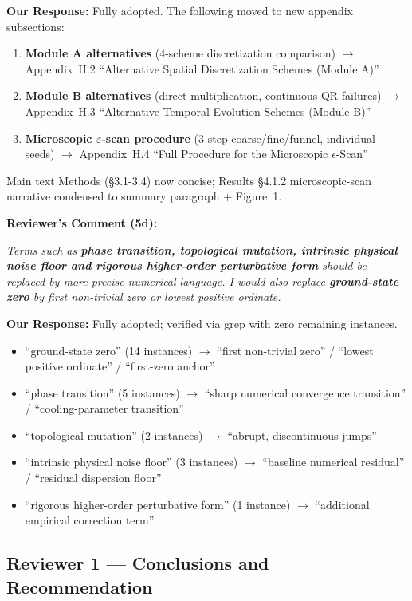 \documentclass[11pt]{article}
\begin{document}
\noindent\textbf{Our Response:} Fully adopted. The following moved to new appendix subsections:
\begin{enumerate}
\item \textbf{Module A alternatives} (4-scheme discretization comparison) $\to$ Appendix~H.2 ``Alternative Spatial Discretization Schemes (Module A)''
\item \textbf{Module B alternatives} (direct multiplication, continuous QR failures) $\to$ Appendix~H.3 ``Alternative Temporal Evolution Schemes (Module B)''
\item \textbf{Microscopic $\varepsilon$-scan procedure} (3-step coarse/fine/funnel, individual seeds) $\to$ Appendix~H.4 ``Full Procedure for the Microscopic $\epsilon$-Scan''
\end{enumerate}
Main text Methods (\S3.1-3.4) now concise; Results \S4.1.2 microscopic-scan narrative condensed to summary paragraph + Figure~1.

\vspace{0.3cm}
\noindent\textbf{Reviewer's Comment (5d):}
\begin{quotebox}
\itshape Terms such as \textbf{phase transition, topological mutation, intrinsic physical noise floor and rigorous higher-order perturbative form} should be replaced by more precise numerical language. I would also replace \textbf{ground-state zero} by first non-trivial zero or lowest positive ordinate.
\end{quotebox}

\noindent\textbf{Our Response:} Fully adopted; verified via grep with zero remaining instances.
\begin{itemize}
\item ``ground-state zero'' (14 instances) $\to$ ``first non-trivial zero'' / ``lowest positive ordinate'' / ``first-zero anchor''
\item ``phase transition'' (5 instances) $\to$ ``sharp numerical convergence transition'' / ``cooling-parameter transition''
\item ``topological mutation'' (2 instances) $\to$ ``abrupt, discontinuous jumps''
\item ``intrinsic physical noise floor'' (3 instances) $\to$ ``baseline numerical residual'' / ``residual dispersion floor''
\item ``rigorous higher-order perturbative form'' (1 instance) $\to$ ``additional empirical correction term''
\end{itemize}

\subsection*{Reviewer 1 --- Conclusions and Recommendation}
\end{document}
